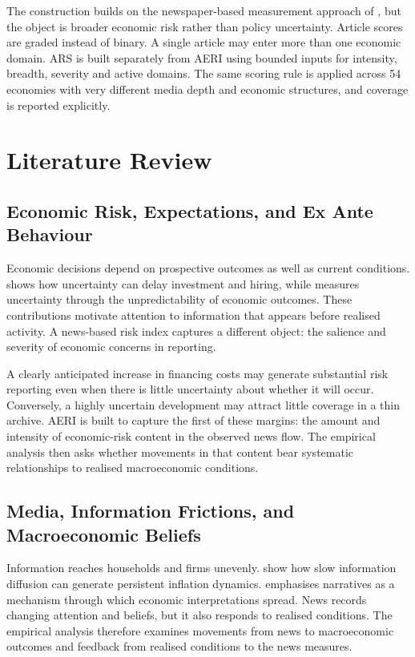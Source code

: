 \documentclass[12pt]{article}
\begin{document}
The construction builds on the newspaper-based measurement approach of \citet{baker2016}, but the object is broader economic risk rather than policy uncertainty. Article scores are graded instead of binary. A single article may enter more than one economic domain. ARS is built separately from AERI using bounded inputs for intensity, breadth, severity and active domains. The same scoring rule is applied across 54 economies with very different media depth and economic structures, and coverage is reported explicitly.

\section{Literature Review}\label{sec:literature}
\subsection{Economic Risk, Expectations, and Ex Ante Behaviour}
Economic decisions depend on prospective outcomes as well as current conditions. \citet{bloom2009} shows how uncertainty can delay investment and hiring, while \citet{jurado2015} measures uncertainty through the unpredictability of economic outcomes. These contributions motivate attention to information that appears before realised activity. A news-based risk index captures a different object: the salience and severity of economic concerns in reporting.

A clearly anticipated increase in financing costs may generate substantial risk reporting even when there is little uncertainty about whether it will occur. Conversely, a highly uncertain development may attract little coverage in a thin archive. AERI is built to capture the first of these margins: the amount and intensity of economic-risk content in the observed news flow. The empirical analysis then asks whether movements in that content bear systematic relationships to realised macroeconomic conditions.
\subsection{Media, Information Frictions, and Macroeconomic Beliefs}
Information reaches households and firms unevenly. \citet{mankiwreis2002} show how slow information diffusion can generate persistent inflation dynamics. \citet{shiller2017} emphasises narratives as a mechanism through which economic interpretations spread. News records changing attention and beliefs, but it also responds to realised conditions. The empirical analysis therefore examines movements from news to macroeconomic outcomes and feedback from realised conditions to the news measures.
\end{document}
